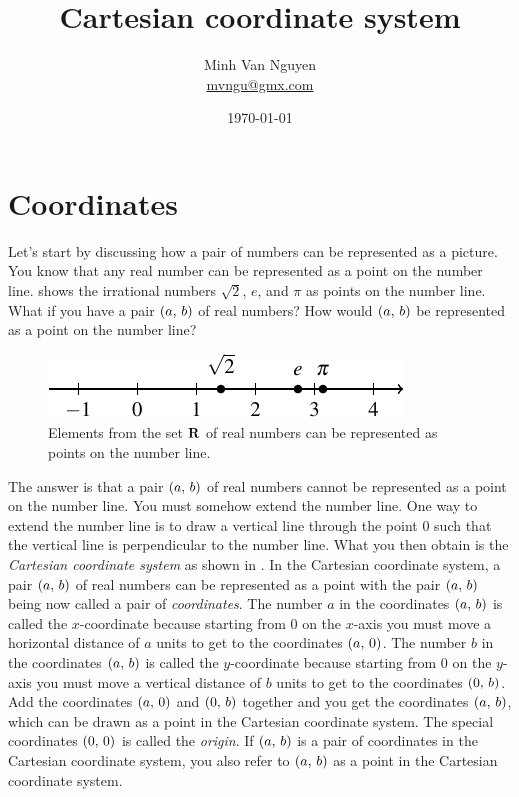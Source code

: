 \documentclass[a4paper,oneside,12pt]{article}
\begin{document}
\title{\Large\bf Cartesian coordinate system}
\author{%
  Minh Van Nguyen \\
  \url{mvngu@gmx.com}
}
\date{\today}
\maketitle



\section{Coordinates}

Let's start by discussing how a pair of numbers can be represented as
a picture.  You know that any real number can be represented as a
point on the number line.   shows the
irrational numbers $\sqrt{2}$, $e$, and $\pi$ as points on the number
line.  What if you have a pair $\left\lparen{a},\, {b}\right\rparen$ of real numbers?  How
would $\left\lparen{a},\, {b}\right\rparen$ be represented as a point on the number line?

\begin{figure}[!htbp]
\centering
\includegraphics[scale=1.1]{image/03/number-line.pdf}
\caption{%
  Elements from the set $\mathbf{R}$ of real numbers can be represented as
  points on the number line.
}
\label{fig:real_number_line}
\end{figure}

The answer is that a pair $\left\lparen{a},\, {b}\right\rparen$ of real numbers cannot be
represented as a point on the number line.  You must somehow extend
the number line.  One way to extend the number line is to draw a
vertical line through the point $0$ such that the vertical line is
perpendicular to the number line.  What you then obtain is the
\emph{Cartesian coordinate system} as shown in
.  In the Cartesian coordinate
system, a pair $\left\lparen{a},\, {b}\right\rparen$ of real numbers can be represented as a
point with the pair $\left\lparen{a},\, {b}\right\rparen$ being now called a pair of
\emph{coordinates}.  The number $a$ in the coordinates $\left\lparen{a},\, {b}\right\rparen$
is called the $x$-coordinate because starting from $0$ on the
$x$-axis you must move a horizontal distance of $a$ units to get to
the coordinates $\left\lparen{a},\, {0}\right\rparen$.  The number $b$ in the coordinates
$\left\lparen{a},\, {b}\right\rparen$ is called the $y$-coordinate because starting from $0$
on the $y$-axis you must move a vertical distance of $b$ units to get
to the coordinates $\left\lparen{0},\, {b}\right\rparen$.  Add the coordinates $\left\lparen{a},\, {0}\right\rparen$
and $\left\lparen{0},\, {b}\right\rparen$ together and you get the coordinates
$\left\lparen{a},\, {b}\right\rparen$, which can be drawn as a point in the Cartesian
coordinate system.  The special coordinates $\left\lparen{0},\, {0}\right\rparen$ is called
the \emph{origin}.  If $\left\lparen{a},\, {b}\right\rparen$ is a pair of coordinates in the
Cartesian coordinate system, you also refer to $\left\lparen{a},\, {b}\right\rparen$ as a
point in the Cartesian coordinate system.
\end{document}
